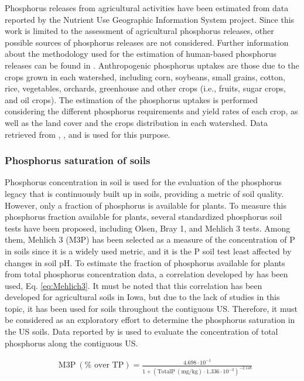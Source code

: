 \begin{refsection}[referencesCh4]
Phosphorus releases from agricultural activities have been estimated from data reported by the Nutrient Use Geographic Information System project. Since this work is limited to the assessment of agricultural phosphorus releases, other possible sources of phosphorus releases are not considered. Further information about the methodology used for the estimation of human-based phosphorus releases can be found in \citet{NuGIS}. Anthropogenic phosphorus uptakes are those due to the crops grown in each watershed, including corn, soybeans, small grains, cotton, rice, vegetables, orchards, greenhouse and other crops (i.e., fruits, sugar crops, and oil crops). The estimation of the phosphorus uptakes is performed considering the different phosphorus requirements and yield rates of each crop, as well as the land cover and the crops distribution in each watershed. Data retrieved from \citet{2017CensusofAgriculture}, \citet{USDAHandbook}, and \citet{EnviroAtlas} is used for this purpose.

\subsubsection{Phosphorus saturation of soils}
Phosphorus concentration in soil is used for the evaluation of the phosphorus legacy that is continuously built up in soils, providing a metric of soil quality. However, only a fraction of phosphorus is available for plants. To measure this phosphorus fraction available for plants, several standardized phosphorus soil tests have been proposed, including Olsen, Bray 1, and Mehlich 3 tests. Among them,  Mehlich 3 (M3P) has been selected as a measure of the concentration of P in soils since it is a widely used metric, and it is the P soil test least affected by changes in soil pH. To estimate the fraction of phosphorus available for plants from total phosphorus concentration data, a correlation developed by \citet{AllenMallarino2006} has been used, Eq. \ref{eq:Mehlich3}. It must be noted that this correlation has been developed for agricultural soils in Iowa, but due to the lack of studies in this topic, it has been used for soils throughout the contiguous US. Therefore, it must be considered as an exploratory effort to determine the phosphorus saturation in the US soils. Data reported by \citet{SoilsUSGS} is used to evaluate the concentration of total phosphorus along the contiguous US.

\begin{align}
& \text{M3P} \ (\% \text{ over TP}) = \frac{4.698 \cdot 10^{-1}}{1+\left(\text{TotalP} \ (\text{mg}/\text{kg}) \cdot 1.336 \cdot 10^{-3}\right)^{-2.148}} \label{eq:Mehlich3}
\end{align}


\end{refsection}

